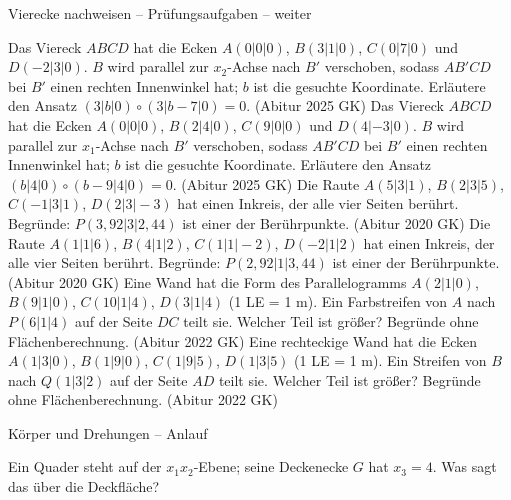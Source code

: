 \begin{aufgabe}{Vierecke nachweisen – Prüfungsaufgaben – weiter}
\begin{teile}
\teil Das Viereck $ABCD$ hat die Ecken $A(0 | 0 | 0)$, $B(3 | 1 | 0)$, $C(0 | 7 | 0)$ und $D(-2 | 3 | 0)$. $B$ wird parallel zur $x_2$-Achse nach $B'$ verschoben, sodass $AB'CD$ bei $B'$ einen rechten Innenwinkel hat; $b$ ist die gesuchte Koordinate. Erläutere den Ansatz $(3 | b | 0) \circ (3 | b - 7 | 0) = 0$. \hfill (Abitur 2025 GK)
\teil Das Viereck $ABCD$ hat die Ecken $A(0 | 0 | 0)$, $B(2 | 4 | 0)$, $C(9 | 0 | 0)$ und $D(4 | -3 | 0)$. $B$ wird parallel zur $x_1$-Achse nach $B'$ verschoben, sodass $AB'CD$ bei $B'$ einen rechten Innenwinkel hat; $b$ ist die gesuchte Koordinate. Erläutere den Ansatz $(b | 4 | 0) \circ (b - 9 | 4 | 0) = 0$. \hfill (Abitur 2025 GK)
\teil Die Raute $A(5 | 3 | 1)$, $B(2 | 3 | 5)$, $C(-1 | 3 | 1)$, $D(2 | 3 | -3)$ hat einen Inkreis, der alle vier Seiten berührt. Begründe: $P(3{,}92 | 3 | 2{,}44)$ ist einer der Berührpunkte. \hfill (Abitur 2020 GK)
\teil Die Raute $A(1 | 1 | 6)$, $B(4 | 1 | 2)$, $C(1 | 1 | -2)$, $D(-2 | 1 | 2)$ hat einen Inkreis, der alle vier Seiten berührt. Begründe: $P(2{,}92 | 1 | 3{,}44)$ ist einer der Berührpunkte. \hfill (Abitur 2020 GK)
\teil Eine Wand hat die Form des Parallelogramms $A(2 | 1 | 0)$, $B(9 | 1 | 0)$, $C(10 | 1 | 4)$, $D(3 | 1 | 4)$ (1 LE = 1 m). Ein Farbstreifen von $A$ nach $P(6 | 1 | 4)$ auf der Seite $DC$ teilt sie. Welcher Teil ist größer? Begründe ohne Flächenberechnung. \hfill (Abitur 2022 GK)
\teil Eine rechteckige Wand hat die Ecken $A(1 | 3 | 0)$, $B(1 | 9 | 0)$, $C(1 | 9 | 5)$, $D(1 | 3 | 5)$ (1 LE = 1 m). Ein Streifen von $B$ nach $Q(1 | 3 | 2)$ auf der Seite $AD$ teilt sie. Welcher Teil ist größer? Begründe ohne Flächenberechnung. \hfill (Abitur 2022 GK)
\end{teile}
\end{aufgabe}

\begin{aufgabe}{Körper und Drehungen – Anlauf}
\begin{teile}
\teil Ein Quader steht auf der $x_1x_2$-Ebene; seine Deckenecke $G$ hat $x_3 = 4$. Was sagt das über die Deckfläche? \\  \\  \\ 
\end{teile}
\end{aufgabe}

